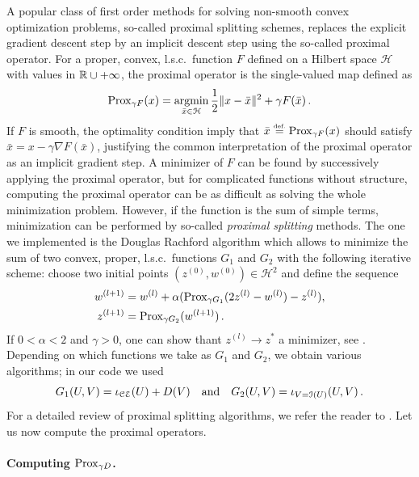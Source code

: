 A popular class of first order methods for solving non-smooth convex optimization problems, so-called proximal splitting schemes, replaces the explicit gradient descent step by an implicit descent step using the so-called proximal operator. For a proper, convex, l.s.c.\ function $F$ defined on a Hilbert space $\mathcal{H}$ with values in $\mathbb{R}\cup +\infty$, the proximal operator is the single-valued map defined as
\[
	\mathop{}\mathopen{}\mathrm{Prox}_{\gamma F}(x) = \operatorname*{argmin}_{\bar{x}\in \mathcal{H}} \frac12 \Vert x - \bar{x}  \Vert^2 + \gamma F(\bar{x}) \, .
\]
If $F$ is smooth, the optimality condition imply that $\bar{x} \stackrel{\mbox{\upshape\tiny def.}}{=} \mathop{}\mathopen{}\mathrm{Prox}_{\gamma F}(x)$ should satisfy $\bar{x} = x-\gamma \nabla F(\bar{x})$, justifying the common interpretation of the proximal operator as an implicit gradient step. 
A minimizer of $F$ can be found by successively applying the proximal operator, but for complicated functions without structure, computing the proximal operator can be as difficult as solving the whole minimization problem. 
However, if the function is the sum of simple terms, minimization can be performed by so-called \emph{proximal splitting} methods. 
The one we implemented is the Douglas Rachford algorithm which allows to minimize the sum of two convex, proper, l.s.c.\ functions $G_1$ and $G_2$ with the following iterative scheme: choose two initial points $(z^{(0)},w^{(0)})\in \mathcal{H}^2$ and define the sequence
\begin{align*}
	w^{(l+1)} &= w^{(l)}+ \alpha (\mathop{}\mathopen{}\mathrm{Prox}_{\gamma G_1}(2z^{(l)}-w^{(l)})-z^{(l)}), \\
	z^{(l+1)} &= \mathop{}\mathopen{}\mathrm{Prox}_{\gamma G_2} (w^{(l+1)}) \, .
\end{align*}
If $0<\alpha<2$ and $\gamma >0$, one can show thant $z^{(l)} \rightarrow z^*$ a minimizer, see \cite{combettes2007douglas}. Depending on which functions we take as $G_1$ and $G_2$, we obtain various algorithms; in our code we used
\[
	G_1(U,V) = \iota_{\mathcal{CE}}(U) + D(V) \quad \text{and} \quad G_2(U,V) = \iota_{V=\mathcal{I}(U)}(U,V) \, . 
\]
For a detailed review of proximal splitting algorithms, we refer the reader to \cite{combettes2011proximal}. Let us now compute the proximal operators.

\paragraph{Computing $\mathop{}\mathopen{}\mathrm{Prox}_{\gamma D}$.}

